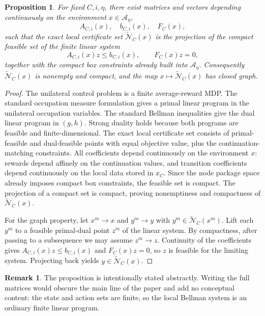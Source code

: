 \documentclass[12pt]{article}
\newtheorem{proposition}[theorem]{Proposition}
\theoremstyle{definition}
\newtheorem{remark}[theorem]{Remark}
\newcommand{\1}{\mathbf{1}}
\newcommand{\cA}{\mathcal{A}}
\newcommand{\cN}{\mathcal{N}}
\begin{document}
\begin{proposition}
\label{prop:local-LP}
For fixed \(C,i,\eta\), there exist matrices and vectors depending continuously on the
environment \(x\in\cA_\eta\),
\[
A_{C,i}(x),\quad b_{C,i}(x),\quad F_C(x),
\]
such that the exact local certificate set \(\widetilde{\cN}_C(x)\) is the projection of
the compact feasible set of the finite linear system
\[
A_{C,i}(x)z\le b_{C,i}(x),
\qquad
F_C(x)z=0,
\]
together with the compact box constraints already built into \(\cA_\eta\).
Consequently \(\widetilde{\cN}_C(x)\) is nonempty and compact, and the map
\(x\mapsto \widetilde{\cN}_C(x)\) has closed graph.
\end{proposition}

\begin{proof}
The unilateral control problem is a finite average-reward MDP.  The standard occupation
measure formulation gives a primal linear program in the unilateral occupation variables.
The standard Bellman inequalities give the dual linear program in \((g,h)\).  Strong
duality holds because both programs are feasible and finite-dimensional.  The exact local
certificate set consists of primal-feasible and dual-feasible points with equal objective
value, plus the continuation-matching constraints.  All coefficients depend continuously on
the environment \(x\): rewards depend affinely on the continuation values, and transition
coefficients depend continuously on the local data stored in \(x_C\).  Since the node
package space already imposes compact box constraints, the feasible set is compact.  The
projection of a compact set is compact, proving nonemptiness and compactness of
\(\widetilde{\cN}_C(x)\).

For the graph property, let \(x^m\to x\) and \(y^m\to y\) with
\(y^m\in \widetilde{\cN}_C(x^m)\).  Lift each \(y^m\) to a feasible primal-dual point
\(z^m\) of the linear system.  By compactness, after passing to a subsequence we may
assume \(z^m\to z\).  Continuity of the coefficients gives
\(A_{C,i}(x)z\le b_{C,i}(x)\) and \(F_C(x)z=0\), so \(z\) is feasible for the limiting
system.  Projecting back yields \(y\in \widetilde{\cN}_C(x)\).
\end{proof}

\begin{remark}
The proposition is intentionally stated abstractly.  Writing the full matrices would
obscure the main line of the paper and add no conceptual content: the state and action
sets are finite, so the local Bellman system is an ordinary finite linear program.
\end{remark}
\end{document}
